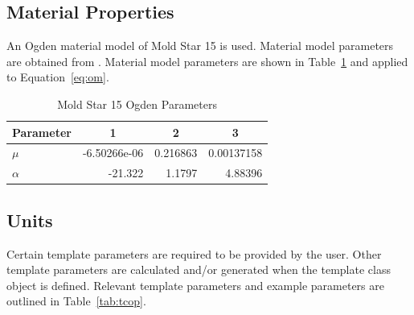 \subsection{Material Properties}

An Ogden material model of Mold Star 15 is used. Material model parameters are obtained from \cite{Ellis2020}. Material model parameters are shown in Table~\ref{tab:ms15om} and applied to Equation~\ref{eq:om}.

\begin{table}[H]
\centering
\caption{Mold Star 15 Ogden Parameters \cite{Ellis2020}}
\label{tab:ms15om}
\begin{tabular}{@{}lrrr@{}}
\toprule
\textbf{Parameter} & \multicolumn{1}{c}{\textbf{1}} & \multicolumn{1}{c}{\textbf{2}} & \multicolumn{1}{c}{\textbf{3}} \\ \midrule
$\mu$              & -6.50266e-06                   & 0.216863                       & 0.00137158                     \\
$\alpha$           & -21.322                        & 1.1797                         & 4.88396                        \\ \bottomrule
\end{tabular}
\end{table}

\subsection{Units}

Certain template parameters are required to be provided by the user. Other template parameters are calculated and/or generated when the template class object is defined. Relevant template parameters and example parameters are outlined in Table~\ref{tab:tcop}.

